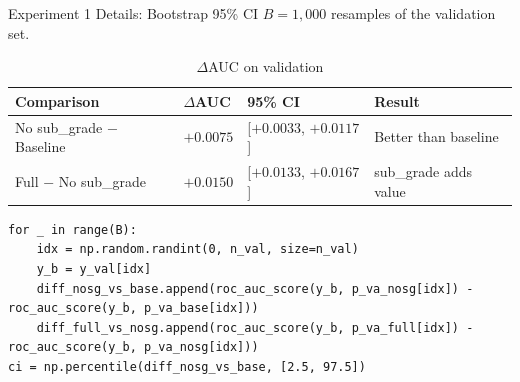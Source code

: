 \documentclass{beamer}
\begin{document}
\begin{frame}[fragile]{Experiment 1 Details: Bootstrap 95\% CI}
  $B=1{,}000$ resamples of the validation set.
  \begin{table}
    \centering
    \tiny
    \caption{$\Delta$AUC on validation}
    \begin{tabular}{llll}
      \hline
      \textbf{Comparison} & \textbf{$\Delta$AUC} & \textbf{95\% CI} & \textbf{Result}\\
      \hline
      No sub\_grade $-$ Baseline & $+0.0075$ & [$+0.0033$, $+0.0117$] & Better than baseline\\
      Full $-$ No sub\_grade & $+0.0150$ & [$+0.0133$, $+0.0167$] & sub\_grade adds value\\
      \hline
    \end{tabular}
  \end{table}
\begin{lstlisting}
for _ in range(B):
    idx = np.random.randint(0, n_val, size=n_val)
    y_b = y_val[idx]
    diff_nosg_vs_base.append(roc_auc_score(y_b, p_va_nosg[idx]) - roc_auc_score(y_b, p_va_base[idx]))
    diff_full_vs_nosg.append(roc_auc_score(y_b, p_va_full[idx]) - roc_auc_score(y_b, p_va_nosg[idx]))
ci = np.percentile(diff_nosg_vs_base, [2.5, 97.5])
\end{lstlisting}
\end{frame}
\end{document}
